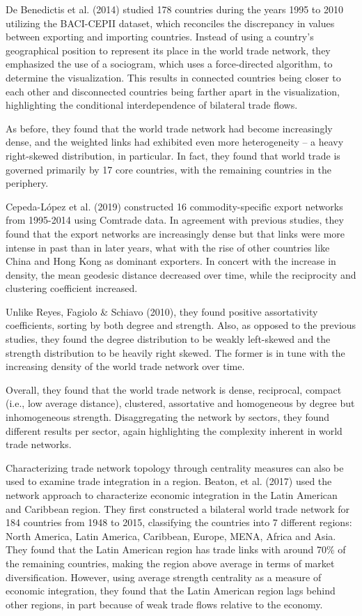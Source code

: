 \documentclass[12pt,letterpaper]{report}
\begin{document}
	De Benedictis et al. (2014) studied 178 countries during the years 1995 to 2010 utilizing the BACI-CEPII dataset, which reconciles the discrepancy in values between exporting and importing countries. Instead of using a country's geographical position to represent its place in the world trade network, they emphasized the use of a sociogram, which uses a force-directed algorithm, to determine the visualization. This results in connected countries being closer to each other and disconnected countries being farther apart in the visualization, highlighting the conditional interdependence of bilateral trade flows.
	
	As before, they found that the world trade network had become increasingly dense, and the weighted links had exhibited even more heterogeneity – a heavy right-skewed distribution, in particular. In fact, they found that world trade is governed primarily by 17 core countries, with the remaining countries in the periphery.
	
	Cepeda-López et al. (2019) constructed 16 commodity-specific export networks from 1995-2014 using Comtrade data. In agreement with previous studies, they found that the export networks are increasingly dense but that links were more intense in past than in later years, what with the rise of other countries like China and Hong Kong as dominant exporters. In concert with the increase in density, the mean geodesic distance decreased over time, while the reciprocity and clustering coefficient increased. 
	
	Unlike Reyes, Fagiolo \& Schiavo (2010), they found positive assortativity coefficients, sorting by both degree and strength. Also, as opposed to the previous studies, they found the degree distribution to be weakly left-skewed and the strength distribution to be heavily right skewed. The former is in tune with the increasing density of the world trade network over time.
	
	Overall, they found that the world trade network is dense, reciprocal, compact (i.e., low average distance), clustered, assortative and homogeneous by degree but inhomogeneous strength. Disaggregating the network by sectors, they found different results per sector, again highlighting the complexity inherent in world trade networks.
	
	Characterizing trade network topology through centrality measures can also be used to examine trade integration in a region. Beaton, et al. (2017) used the network approach to characterize economic integration in the Latin American and Caribbean region. They first constructed a bilateral world trade network for 184 countries from 1948 to 2015, classifying the countries into 7 different regions: North America, Latin America, Caribbean, Europe, MENA, Africa and Asia. They found that the Latin American region has trade links with around 70\% of the remaining countries, making the region above average in terms of market diversification. However, using average strength centrality as a measure of economic integration, they found that the Latin American region lags behind other regions, in part because of weak trade flows relative to the economy.
	
\end{document}
